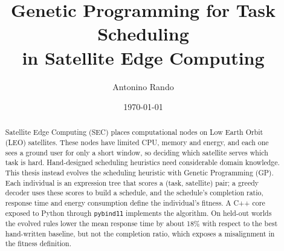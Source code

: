 \documentclass[11pt,a4paper,oneside]{report}
\title{Genetic Programming for Task Scheduling\\in Satellite Edge Computing}
\author{Antonino Rando}
\date{\today}
\begin{document}
\maketitle

\begin{abstract}
Satellite Edge Computing (SEC) places computational nodes on Low Earth Orbit (LEO)
satellites. These nodes have limited CPU, memory and energy, and each one sees a
ground user for only a short window, so deciding which satellite serves which
task is hard. Hand-designed scheduling heuristics need considerable domain
knowledge. This thesis instead evolves the scheduling heuristic with Genetic
Programming (GP). Each individual is an expression tree that scores a
(task, satellite) pair; a greedy decoder uses these scores to build a schedule,
and the schedule's completion ratio, response time and energy consumption define
the individual's fitness. A C++ core exposed to Python through \texttt{pybind11}
implements the algorithm. On held-out worlds the evolved rules lower the mean response time by about 18\% with respect to the best hand-written baseline, but not the completion ratio, which exposes a misalignment in the fitness definition.
\end{abstract}

\tableofcontents












\end{document}
